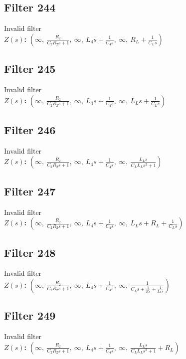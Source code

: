 \documentclass{article}
\begin{document}
\subsection*{Filter 244}
Invalid filter \\ 
\textbf{$Z(s)$:} $\left( \infty, \  \frac{R_{2}}{C_{2} R_{2} s + 1}, \  \infty, \  L_{4} s + \frac{1}{C_{4} s}, \  \infty, \  R_{L} + \frac{1}{C_{L} s}\right)$ \\ 
\subsection*{Filter 245}
Invalid filter \\ 
\textbf{$Z(s)$:} $\left( \infty, \  \frac{R_{2}}{C_{2} R_{2} s + 1}, \  \infty, \  L_{4} s + \frac{1}{C_{4} s}, \  \infty, \  L_{L} s + \frac{1}{C_{L} s}\right)$ \\ 
\subsection*{Filter 246}
Invalid filter \\ 
\textbf{$Z(s)$:} $\left( \infty, \  \frac{R_{2}}{C_{2} R_{2} s + 1}, \  \infty, \  L_{4} s + \frac{1}{C_{4} s}, \  \infty, \  \frac{L_{L} s}{C_{L} L_{L} s^{2} + 1}\right)$ \\ 
\subsection*{Filter 247}
Invalid filter \\ 
\textbf{$Z(s)$:} $\left( \infty, \  \frac{R_{2}}{C_{2} R_{2} s + 1}, \  \infty, \  L_{4} s + \frac{1}{C_{4} s}, \  \infty, \  L_{L} s + R_{L} + \frac{1}{C_{L} s}\right)$ \\ 
\subsection*{Filter 248}
Invalid filter \\ 
\textbf{$Z(s)$:} $\left( \infty, \  \frac{R_{2}}{C_{2} R_{2} s + 1}, \  \infty, \  L_{4} s + \frac{1}{C_{4} s}, \  \infty, \  \frac{1}{C_{L} s + \frac{1}{R_{L}} + \frac{1}{L_{L} s}}\right)$ \\ 
\subsection*{Filter 249}
Invalid filter \\ 
\textbf{$Z(s)$:} $\left( \infty, \  \frac{R_{2}}{C_{2} R_{2} s + 1}, \  \infty, \  L_{4} s + \frac{1}{C_{4} s}, \  \infty, \  \frac{L_{L} s}{C_{L} L_{L} s^{2} + 1} + R_{L}\right)$ \\ 
\end{document}
